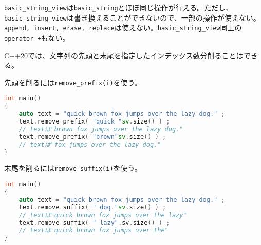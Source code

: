 
\texttt{basic\_string\_view}は\texttt{basic\_string}とほぼ同じ操作が行える。ただし、\texttt{basic\_string\_view}は書き換えることができないので、一部の操作が使えない。\texttt{append, insert, erase, replace}は使えない。\texttt{basic\_string\_view}同士の\texttt{operator +}もない。

C++20では、文字列の先頭と末尾を指定したインデックス数分削ることはできる。

先頭を削るには\texttt{remove\_prefix(i)}を使う。

\begin{lstlisting}[language={C++}]
int main()
{
    auto text = "quick brown fox jumps over the lazy dog." ;
    text.remove_prefix( "quick "sv.size() ) ;
    // textは"brown fox jumps over the lazy dog."
    text.remove_prefix( "brown"sv.size() ) ;
    // textは"fox jumps over the lazy dog."
}
\end{lstlisting}

末尾を削るには\texttt{remove\_suffix(i)}を使う。

\begin{lstlisting}[language={C++}]
int main()
{
    auto text = "quick brown fox jumps over the lazy dog." ;
    text.remove_suffix( " dog."sv.size() ) ;
    // textは"quick brown fox jumps over the lazy"
    text.remove_suffix( " lazy".sv.size() ) ;
    // textは"quick brown fox jumps over the"
}
\end{lstlisting}


